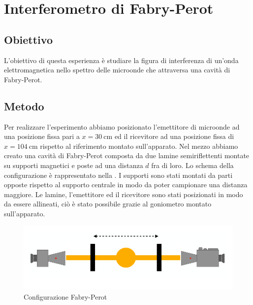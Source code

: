 \documentclass[a4paper]{article}
\begin{document}
\section{Interferometro di Fabry-Perot}
\subsection{Obiettivo}
L'obiettivo di questa esperienza è studiare la figura di interferenza di un'onda elettromagnetica nello spettro delle microonde che attraversa una cavità di Fabry-Perot.
\subsection{Metodo}
Per realizzare l'esperimento abbiamo posizionato l'emettitore di microonde ad una posizione fissa pari a $x=\SI{30}{\centi\metre}$ ed il ricevitore ad una posizione fissa di $x=\SI{104}{\centi\metre}$ rispetto al riferimento montato sull'apparato. Nel mezzo abbiamo creato una cavità di Fabry-Perot composta da due lamine semiriflettenti montate su supporti magnetici e poste ad una distanza $d$ fra di loro. Lo schema della configurazione è rappresentato nella . I supporti sono stati montati da parti opposte rispetto al supporto centrale in modo da poter campionare una distanza maggiore. Le lamine, l'emettitore ed il ricevitore sono stati posizionati in modo da essere allineati, ciò è stato possibile grazie al goniometro montato sull'apparato.
\begin{figure}[H]
    \centering
    \includegraphics[width=0.7\linewidth]{grafici/Fabry-Perot_configurazione.png}
    \caption{Configurazione Fabry-Perot}
    \label{fig:Configurazione_Fabry_Perot}
\end{figure}
\end{document}
